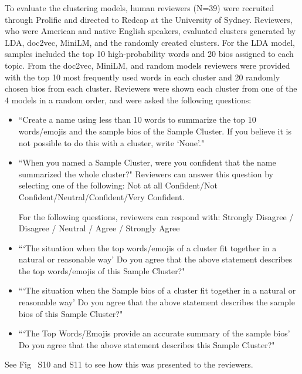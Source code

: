 \documentclass{article}
\begin{document}
To evaluate the clustering models, human reviewers (N=39) were recruited through Prolific\cite{Prolific} and directed to Redcap at the University of Sydney\cite{harris2009redcap, harris2019redcap}.
Reviewers, who were American and native English speakers, evaluated clusters generated by LDA, doc2vec, MiniLM, and the randomly created clusters. For the LDA model, samples included the top 10 high-probability words and 20 bios assigned to each topic. From the doc2vec, MiniLM, and random models reviewers were provided with the top 10 most frequently used words in each cluster and 20 randomly chosen bios from each cluster.  Reviewers were shown each cluster from one of the 4 models in a random order, and were asked the following questions: 

\begin{itemize}
\item ``Create a name using less than 10 words to summarize the top 10 words/emojis and the sample bios of the Sample Cluster. If you believe it is not possible to do this with a cluster, write `None'."
\item ``When you named a Sample Cluster, were you confident that the name summarized the whole cluster?" Reviewers can answer this question by selecting one of the following: Not at all Confident/Not Confident/Neutral/Confident/Very Confident. 
\vspace{5mm}


For the following questions, reviewers can respond with: Strongly Disagree / Disagree / Neutral / Agree / Strongly Agree

\item ```The situation when the top words/emojis of a cluster fit together in a natural or reasonable way' Do you agree that the above statement describes the top words/emojis of this Sample Cluster?" 
\item ```The situation when the Sample bios of a cluster fit together in a natural or reasonable way' Do you agree that the above statement describes the sample bios of this Sample Cluster?" 
\item ```The Top Words/Emojis provide an accurate summary of the sample bios' Do you agree that the above statement describes this Sample Cluster?" 

\end{itemize}
See Fig~ S10 and S11 to see how this was presented to the reviewers.
\end{document}
